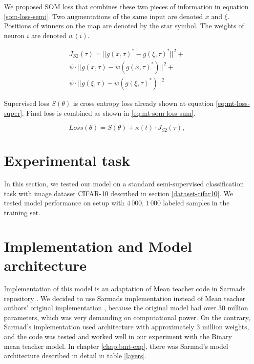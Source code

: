 We proposed SOM loss that combines these two pieces of information in equation \ref{som-loss-semi}. Two augmentations of the same input are denoted $x$ and $\xi$. Positions of winners on the map are denoted by the star symbol. The weights of neuron $i$ are denoted $w(i)$.

\begin{equation} \label{som-loss-semi}
\begin{split}
    J_{S2}(\tau) = || g(x, \tau)^* - g(\xi, \tau)^* ||^2 + \\[10pt]
    \psi \cdot || g(x, \tau) - w(g(x, \tau)^*) ||^2 +  \\[10pt]
    \psi \cdot || g(\xi, \tau) - w(g(\xi, \tau)^*) ||^2
\end{split}
\end{equation}


Supervised loss $S(\theta)$ is cross entropy loss already shown at equation \ref{eq:mt-loss-super}. Final loss is combined as shown in \ref{eq:mt-som-loss-sum}.

\begin{equation}
	Loss(\theta) = S(\theta) + \kappa(t) \cdot J_{S2}(\tau),
	\label{eq:mt-som-loss-sum}
\end{equation} 


\section{Experimental task}
In this section, we tested our model on a standard semi-supervised classification task with image dataset CIFAR-10 described in section \ref{dataset-cifar10}. We tested model performance on setup with $4\,000$, $1\,000$ labeled samples in the training set.


\section{Implementation and Model architecture}
Implementation of this model is an adaptation of Mean teacher code in Sarmads repository \cite{sarmad-repo}. 
We decided to use Sarmads implementation instead of Mean teacher authors' original implementation \cite{curiousai}, because the original model had over $30$ million parameters, which was very demanding on computational power. On the contrary, Sarmad's implementation used architecture with approximately $3$ million weights, and the code was tested and worked well in our experiment with the Binary mean teacher model. In chapter \ref{chap:bmt-exp}, there was Sarmad's model architecture described in detail in table \ref{layers}. 


